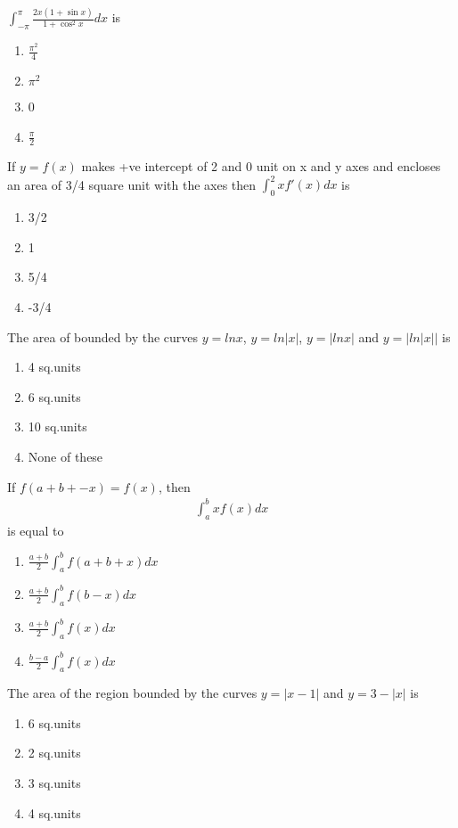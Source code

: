 \item $\int_{-\pi}^{\pi}\frac{2x(1 + \sin x)}{1 + \cos^{2}x}dx$ is
\begin{enumerate}
\item $\frac{\pi^{2}}{4}$
\item $\pi^{2}$
\item 0
\item $\frac{\pi}{2}$
\end{enumerate}  

\item If $y = f(x)$ makes +ve intercept of 2 and 0 unit on x and y axes and encloses an area of 3/4 square unit with the axes then $\int_{0}^{2}xf'(x)dx$ is
\begin{enumerate}
\item 3/2
\item 1
\item 5/4
\item -3/4
\end{enumerate}

\item The area of bounded by the curves $y  = lnx $, $y = ln|x|$, $y = |ln x|$ and $y = |ln|x||$ is
\begin{enumerate}
\item 4 sq.units
\item 6 sq.units
\item 10 sq.units
\item None of these
\end{enumerate}

\item If $f(a + b + -x) = f(x)$, then 
\begin{align*}
\int_{a}^{b}xf(x)dx
\end{align*}
is equal to
\begin{enumerate}
\item $\frac{a + b}{2}\int_{a}^{b}f(a + b + x)dx$
\item $\frac{a + b}{2}\int_{a}^{b}f(b - x)dx$
\item $\frac{a + b}{2}\int_{a}^{b}f(x)dx$
\item $\frac{b - a}{2}\int_{a}^{b}f(x)dx$
\end{enumerate}

\item The area of the region bounded by the curves $y = |x - 1|$ and $y = 3 - |x|$ is
\begin{enumerate}
\item 6 sq.units
\item 2 sq.units
\item 3 sq.units
\item 4 sq.units
\end{enumerate}

